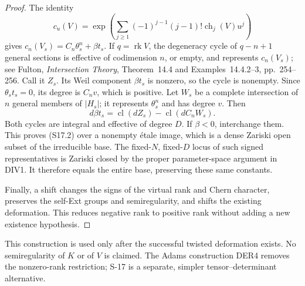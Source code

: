 \begin{proof}
The identity
\[
 c_u(V)=\exp\!\left(\sum_{j\ge1}
             (-1)^{j-1}(j-1)!\operatorname{ch}_j(V)u^j\right)
\]
gives $c_n(V_s)=C_n\theta_s^n+\beta t_s$.
If $q=\operatorname{rk}V$, the degeneracy cycle of $q-n+1$
general sections is effective of codimension $n$, or empty,
and represents $c_n(V_s)$; see Fulton, \emph{Intersection
Theory}, Theorem~14.4 and Examples~14.4.2--3, pp.~254--256.
Call it $Z_s$. Its Weil component $\beta t_s$ is nonzero,
so the cycle is nonempty. Since $\theta_st_s=0$, its degree is
$C_nv$, which is positive. Let $W_s$ be a complete intersection
of $n$ general members of $|H_s|$; it represents $\theta_s^n$
and has degree $v$. Then
\[
 d\beta t_s=\operatorname{cl}(dZ_s)
                   -\operatorname{cl}(dC_nW_s).
\]
Both cycles are integral and effective of degree $D$.
If $\beta<0$, interchange them. This proves (S17.2) over a
nonempty \'etale image, which is a dense Zariski open subset
of the irreducible base. The fixed-$N$, fixed-$D$ locus of such
signed representatives is Zariski closed by the proper
parameter-space argument in DIV1. It therefore equals the
entire base, preserving these same constants.

Finally, a shift changes the signs of the virtual rank and
Chern character, preserves the self-Ext groups and
semiregularity, and shifts the existing deformation.
This reduces negative rank to positive rank without adding
a new existence hypothesis.
\end{proof}

This construction is used only after the successful twisted
deformation exists. No semiregularity of $K$ or of $V$ is claimed.
The Adams construction DER4 removes the nonzero-rank restriction;
S-17 is a separate, simpler tensor--determinant alternative.

